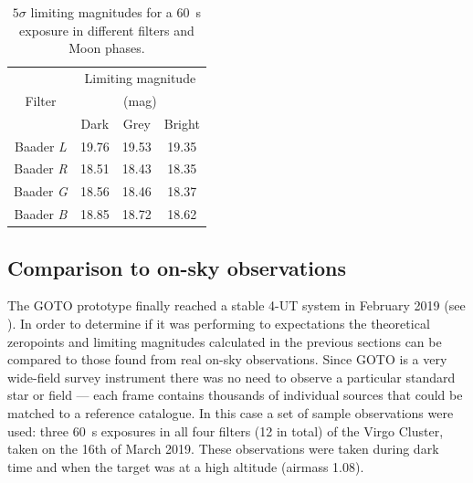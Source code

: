 \begin{colsection}
\begin{colsection}
\begin{table}[t]
    \begin{center}
        \begin{tabular}{c|ccc} %
                   & \multicolumn{3}{c}{Limiting magnitude} \\
            Filter & \multicolumn{3}{c}{(mag)} \\
                   & Dark & Grey & Bright \\
            \midrule
            Baader \textit{L} & 19.76 & 19.53 & 19.35 \\
            Baader \textit{R} & 18.51 & 18.43 & 18.35 \\
            Baader \textit{G} & 18.56 & 18.46 & 18.37 \\
            Baader \textit{B} & 18.85 & 18.72 & 18.62 \\
        \end{tabular}
    \end{center}
    \caption[$5\sigma$ limiting magnitudes for a \SI{60}{\second} exposure]{
        $5\sigma$ limiting magnitudes for a \SI{60}{\second} exposure in different filters and Moon phases.
    }\label{tab:lim_mags}
\end{table}

\end{colsection}

\newpage
\subsection{Comparison to on-sky observations}
\label{sec:onsky_comparison}
\begin{colsection}

The GOTO prototype finally reached a stable 4-UT system in February 2019 (see ). In order to determine if it was performing to expectations the theoretical zeropoints and limiting magnitudes calculated in the previous sections can be compared to those found from real on-sky observations. Since GOTO is a very wide-field survey instrument there was no need to observe a particular standard star or field --- each frame contains thousands of individual sources that could be matched to a reference catalogue. In this case a set of sample observations were used: three \SI{60}{\second} exposures in all four filters (12 in total) of the Virgo Cluster, taken on the 16th of March 2019. These observations were taken during dark time and when the target was at a high altitude (airmass 1.08).


\end{colsection}
\end{colsection}
